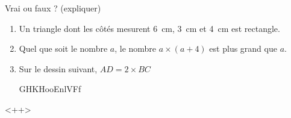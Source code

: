 
\begin{exercice}\label{exo2smath-0154}

    Vrai ou faux ? (expliquer)
    \begin{enumerate}
        \item
            Un triangle dont les côtés mesurent \SI{6}{\centi\meter}, \SI{3}{\centi\meter} et \SI{4}{\centi\meter} est rectangle.
        \item
            Quel que soit le nombre \( a\), le nombre \( a\times (a+4)\) est plus grand que \( a\).
        \item
            Sur le dessin suivant, \( AD=2\times BC\) 

GHKHooEnlVFf

\begin{center}
   
\end{center}

    \end{enumerate}
    <++>

\end{exercice}

